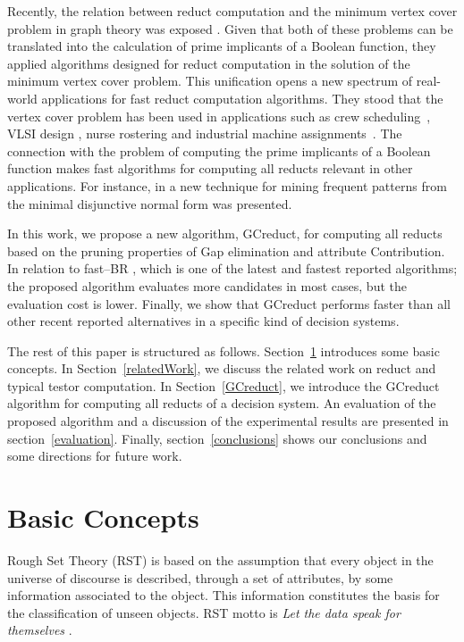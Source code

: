 \documentclass[number,preprint,review,12pt]{elsarticle}
\begin{document}
  Recently, the relation between reduct computation and the minimum vertex cover problem in graph theory was exposed \cite{chen2015}. Given that both of these problems can be translated into the calculation of prime implicants of a Boolean function, they applied algorithms designed for reduct computation in the solution of the minimum vertex cover problem. This unification opens a new spectrum of real-world applications for fast reduct computation algorithms. They stood that the vertex cover problem has been used in applications such as crew scheduling~\citep{Sherali1984}, VLSI design \citep{Bhattacharyya2000}, nurse rostering \citep{Caprara1998} and industrial machine assignments~\citep{Woodyatt1993}. The connection with the problem of computing the prime implicants of a Boolean function makes fast algorithms for computing all reducts relevant in other applications. For instance, in \cite{Li2015} a new technique for mining frequent patterns from the minimal disjunctive normal form was presented.

  In this work, we propose a new algorithm, GCreduct, for computing all reducts based on the pruning properties of Gap elimination and attribute Contribution. 
  In relation to fast--BR \citep{Lias13}, which is one of the latest and fastest reported algorithms; the proposed algorithm evaluates more candidates in most cases, but the evaluation cost is lower. Finally, we show that GCreduct performs faster than all other recent reported alternatives in a specific kind of decision systems. 
  
  The rest of this paper is structured as follows. Section~\ref{basicConcepts}  introduces some basic concepts. In Section~\ref{relatedWork}, we discuss the related work on reduct and typical testor computation.  In Section~\ref{GCreduct}, we introduce the GCreduct algorithm for computing all reducts of a decision system. An evaluation of the proposed algorithm and a discussion of the experimental results are presented in section~\ref{evaluation}. Finally, section~\ref{conclusions} shows our conclusions and some directions for future work.
   
\section{Basic Concepts}\label{basicConcepts}
  Rough Set Theory (RST) is based on the assumption that every object in the universe of discourse is described, through a set of attributes, by some information associated to the object. This information constitutes the basis for the classification of unseen objects. RST motto is \textit{Let the data speak for themselves} \citep{Tiwari14}.
\end{document}
